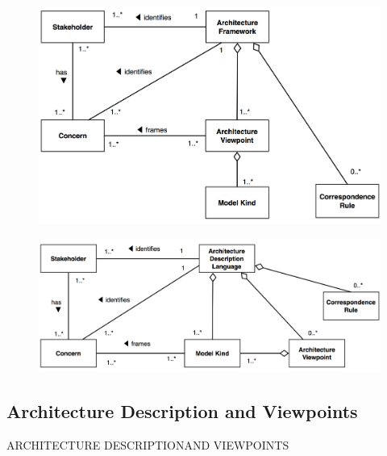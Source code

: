 		\begin{frame}
					\begin{figure}
						\begin{center}
							\includegraphics[width=\textwidth]{img/ConceptualModelFramework}
						\end{center}
					\end{figure}
		\end{frame}
		
		\begin{frame}
			\begin{figure}
						\begin{center}
							\includegraphics[width=\textwidth]{img/ConceptualModelADL}
						\end{center}
					\end{figure}
		\end{frame}
		
		\subsection{Architecture Description and Viewpoints}
		
		\begin{frame}
			\begin{center}
				\begin{LARGE}
					ARCHITECTURE DESCRIPTION\newline\newline AND VIEWPOINTS
				\end{LARGE}
			\end{center}
		\end{frame}
				

